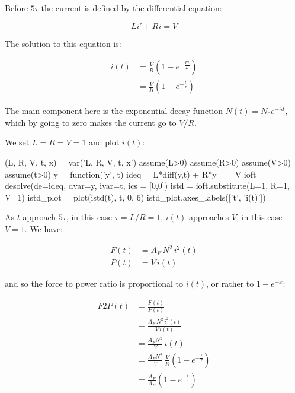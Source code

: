 \documentclass[]{elementary-physics}
\begin{document}
Before $5 \tau$ the current is defined by the differential equation:

\begin{equation}
L i' + R i = V
\end{equation}

The solution to this equation is:

\begin{subequations}
\begin{align}
i(t) &= \frac{V}{R} (1 - e^{- \frac{R t}{L}}) \\
&= \frac{V}{R} (1 - e^{- \frac{t}{\tau}})
\end{align}
\end{subequations}

The main component here is the exponential decay function\cite{expdec} $N(t)=N_0e^{-\lambda t}$, which by going to zero 	makes the current go to $V/R$.

We set $L = R = V = 1$ and plot $i(t)$:

\begin{sagesilent}
(L, R, V, t, x) = var('L, R, V, t, x')
assume(L>0)
assume(R>0)
assume(V>0)
assume(t>0)
y = function('y', t)
ideq = L*diff(y,t) + R*y == V
ioft = desolve(de=ideq, dvar=y, ivar=t, ics = [0,0])
istd = ioft.substitute(L=1, R=1, V=1)
istd_plot = plot(istd(t), t, 0, 6)
istd_plot.axes_labels(['t', 'i(t)'])
\end{sagesilent}


As $t$ approach $5\tau$, in this case $\tau = L/R = 1$, $i(t)$ approaches $V$, in this case $V=1$.
We have:

\begin{subequations}
\begin{align}
F(t) &= A_F \, N^2 \, i^2(t) \\
P(t) &= V \, i(t)
\end{align}
\end{subequations}

and so the force to power ratio is proportional to $i(t)$, or rather to $1-e^{-x}$:

\begin{subequations}
\begin{align}
F2P(t) &= \frac{F(t)}{P(t)} \\
&= \frac{A_F \, N^2 \, i^2(t)}{V \, i(t)} \\
&= \frac{A_F N^2}{V} \, i(t) \\
&= \frac{A_F N^2}{V} \, \frac{V}{R} (1 - e^{- \frac{t}{\tau}}) \\
&= \frac{A_F}{A_R} (1 - e^{- \frac{t}{\tau}})
\end{align}
\end{subequations}
\end{document}
